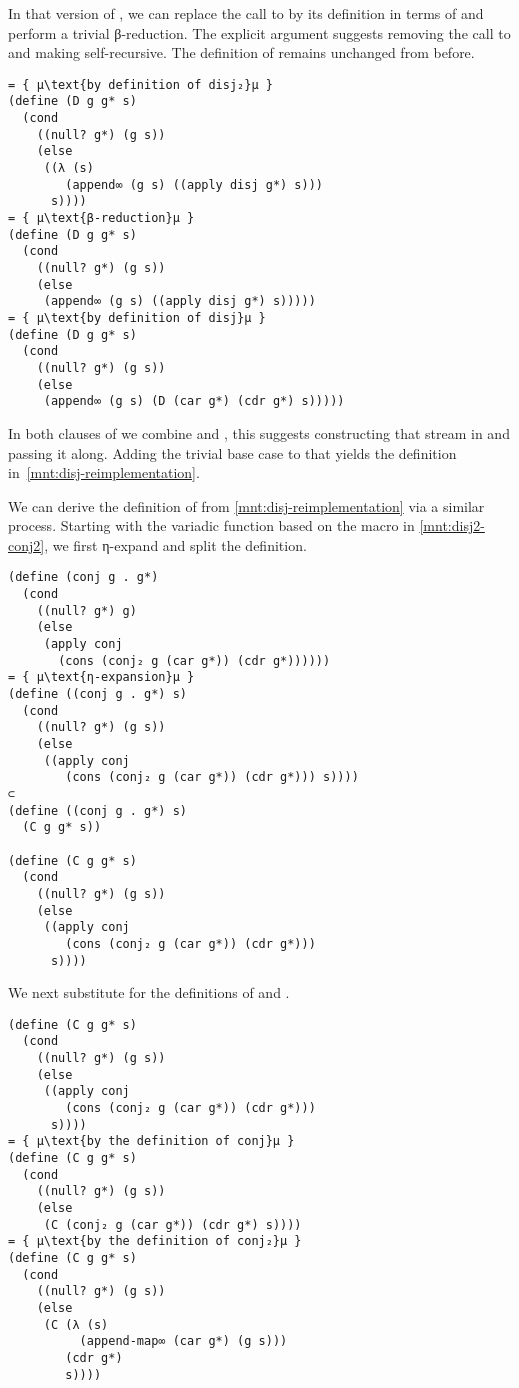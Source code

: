 \documentclass[sigplan,balance=true,pbalance=true,natbib=false]{acmart}
\begin{document}
In that version of , we can replace the call to
 by its definition in terms of 
and perform a trivial β-reduction. The explicit 
argument suggests removing the call to  and making
 self-recursive. The definition of 
remains unchanged from before.

\begin{verbatim}
= { μ\text{by definition of disj₂}μ }
(define (D g g* s)
  (cond
    ((null? g*) (g s))
    (else
     ((λ (s)
        (append∞ (g s) ((apply disj g*) s)))
      s))))
= { μ\text{β-reduction}μ }
(define (D g g* s)
  (cond
    ((null? g*) (g s))
    (else
     (append∞ (g s) ((apply disj g*) s)))))
= { μ\text{by definition of disj}μ }
(define (D g g* s)
  (cond
    ((null? g*) (g s))
    (else
     (append∞ (g s) (D (car g*) (cdr g*) s)))))
\end{verbatim}

In both clauses of  we combine  and
, this suggests constructing that stream in
 and passing it along. Adding the trivial base case
to that  yields the definition
in~\cref{mnt:disj-reimplementation}.

We can derive the definition of  from
\cref{mnt:disj-reimplementation} via a similar process. Starting with
the variadic function based on the macro in \cref{mnt:disj2-conj2}, we
first η-expand and split the definition.

\begin{verbatim}
(define (conj g . g*)
  (cond
    ((null? g*) g)
    (else
     (apply conj
       (cons (conj₂ g (car g*)) (cdr g*))))))
= { μ\text{η-expansion}μ }
(define ((conj g . g*) s)
  (cond
    ((null? g*) (g s))
    (else
     ((apply conj
        (cons (conj₂ g (car g*)) (cdr g*))) s))))
⊂
(define ((conj g . g*) s)
  (C g g* s))

(define (C g g* s)
  (cond
    ((null? g*) (g s))
    (else
     ((apply conj
        (cons (conj₂ g (car g*)) (cdr g*)))
      s))))
\end{verbatim}

\noindent We next substitute for the definitions of 
and .

\begin{verbatim}
(define (C g g* s)
  (cond
    ((null? g*) (g s))
    (else
     ((apply conj
        (cons (conj₂ g (car g*)) (cdr g*)))
      s))))
= { μ\text{by the definition of conj}μ }
(define (C g g* s)
  (cond
    ((null? g*) (g s))
    (else
     (C (conj₂ g (car g*)) (cdr g*) s))))
= { μ\text{by the definition of conj₂}μ }
(define (C g g* s)
  (cond
    ((null? g*) (g s))
    (else
     (C (λ (s)
          (append-map∞ (car g*) (g s)))
        (cdr g*)
        s))))
\end{verbatim}
\end{document}
